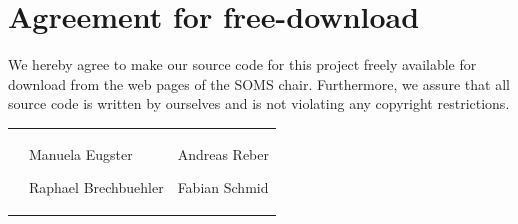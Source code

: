 \documentclass[11pt]{article}
\begin{document}

\newpage


\newpage
\section*{Agreement for free-download}
\bigskip


\bigskip


\large We hereby agree to make our source code for this project freely available for download from the web pages of the SOMS chair. Furthermore, we assure that all source code is written by ourselves and is not violating any copyright restrictions.

\begin{center}

\bigskip


\bigskip


\begin{tabular}{@{}p{3.3cm}@{}p{6cm}@{}@{}p{6cm}@{}}
\begin{minipage}{3cm}

\end{minipage}
&
\begin{minipage}{6cm}
\vspace{2mm} \large Manuela Eugster
\end{minipage}

\bigskip
\bigskip
\begin{minipage}{6cm}
\vspace{2mm} \large Raphael Brechbuehler
\end{minipage}
&
\begin{minipage}{6cm}
\vspace{2mm}\large Andreas Reber
\end{minipage}

\bigskip
\bigskip

\begin{minipage}{6cm}
\vspace{2mm} \large Fabian Schmid

\end{minipage}
\end{tabular}


\end{center}
\newpage

\end{document}
